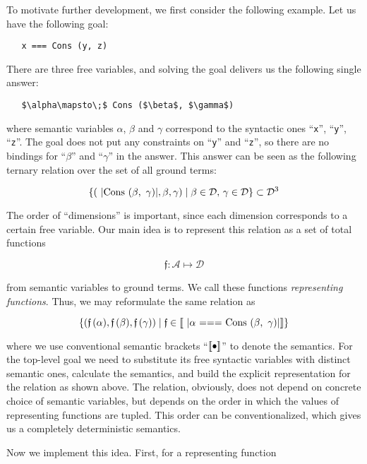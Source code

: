 To motivate further development, we first consider the following example. Let us have the following goal:

\begin{lstlisting}
   x === Cons (y, z)
\end{lstlisting}

There are three free variables, and solving the goal delivers us the following single answer:

\begin{lstlisting}
   $\alpha\mapsto\;$ Cons ($\beta$, $\gamma$)
\end{lstlisting}

where semantic variables $\alpha$, $\beta$ and $\gamma$ correspond to the syntactic ones ``\lstinline|x|'', ``\lstinline|y|'', ``\lstinline|z|''. The
goal does not put any constraints on ``\lstinline|y|'' and ``\lstinline|z|'', so there are no bindings for ``$\beta$'' and ``$\gamma$'' in the answer.
This answer can be seen as the following ternary relation over the set of all ground terms:

\[
\{(\mbox{\lstinline|Cons ($\beta$, $\,\gamma$)|}, \beta, \gamma) \mid \beta\in\mathcal{D},\,\gamma\in\mathcal{D}\}\subset\mathcal{D}^3
\]

The order of ``dimensions'' is important, since each dimension corresponds to a certain free variable. Our main idea is to represent this relation as a set of total
functions 

\[
\mathfrak{f}:\mathcal{A}\mapsto\mathcal{D}
\]

from semantic variables to ground terms. We call these functions \emph{representing functions}. Thus, we may reformulate the same relation as

\[
\{(\mathfrak{f}\,(\alpha),\mathfrak{f}\,(\beta),\mathfrak{f}\,(\gamma))\mid\mathfrak{f}\in\sembr{\mbox{\lstinline|$\alpha$ === Cons ($\beta$, $\,\gamma$)|}}\}
\]

where we use conventional semantic brackets ``$\llbracket{\bullet}\rrbracket$'' to denote the semantics. For the top-level goal we need to substitute its free syntactic
variables with distinct semantic ones, calculate the semantics, and build the explicit representation for the relation as shown above. The relation, obviously,
does not depend on concrete choice of semantic variables, but depends on the order in which the values of representing functions are tupled. This order can be
conventionalized, which gives us a completely deterministic semantics.

Now we implement this idea. First, for a representing function

